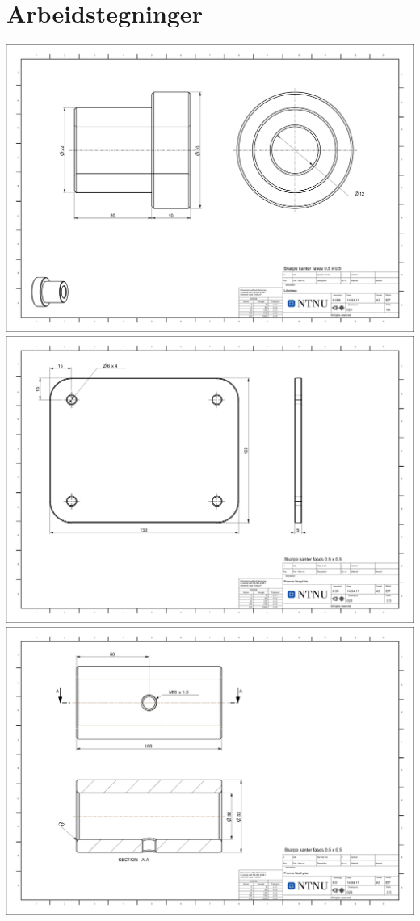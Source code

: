 \chapter{Arbeidstegninger}
\newpage
\includegraphics[angle=90, width=\textwidth]{arbeidstegninger/021}\newpage
\includegraphics[angle=90, width=\textwidth]{arbeidstegninger/025}\newpage
\includegraphics[angle=90, width=\textwidth]{arbeidstegninger/026}\newpage
